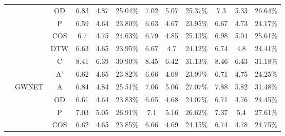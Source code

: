 \begin{table}[t!]
\begin{center}
{\begin{tabular}{c|c|c|ccc|ccc|ccc}
                                                 &                        & OD                      & 6.83       & 4.87      & 25.04\%     & 7.02      & 5.07      & 25.37\%     & 7.3        & 5.33       & 26.64\%     \\
                                                 &                        & P                       & 6.59       & 4.64      & 23.80\%     & 6.63      & 4.67      & 23.95\%     & 6.67       & 4.73       & 24.17\%     \\
                                                 &                        & COS                     & 6.7        & 4.75      & 24.63\%     & 6.79      & 4.85      & 25.13\%     & 6.98       & 5.04       & 25.61\%     \\
                                                 &                        & DTW                     & 6.63       & 4.65      & 23.95\%     & 6.67      & 4.7       & 24.12\%     & 6.74       & 4.8        & 24.41\%     \\
                                                 &                        & C                       & 8.41       & 6.39      & 30.90\%     & 8.45      & 6.42      & 31.13\%     & 8.46       & 6.43       & 31.18\%     \\
                                                 &                        & A'                      & 6.62       & 4.65      & 23.82\%     & 6.66      & 4.68      & 23.99\%     & 6.71       & 4.75       & 24.25\%     \\
                \cline{2-12}
                                                 & \multirow{7}{*}{GWNET} & A                       & 6.84       & 4.84      & 25.51\%     & 7.06      & 5.06      & 27.07\%     & 7.88       & 5.82       & 31.48\%     \\
                                                 &                        & OD                      & 6.61       & 4.64      & 23.83\%     & 6.65      & 4.68      & 24.07\%     & 6.71       & 4.76       & 24.45\%     \\
                                                 &                        & P                       & 7.03       & 5.05      & 26.91\%     & 7.1       & 5.16      & 26.62\%     & 7.37       & 5.4        & 27.61\%     \\
                                                 &                        & COS                     & 6.62       & 4.65      & 23.85\%     & 6.66      & 4.69      & 24.15\%     & 6.74       & 4.78       & 24.75\%     \\

\end{tabular}}
\end{center}
\end{table}
